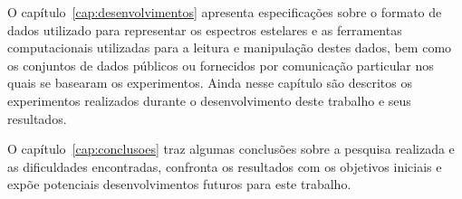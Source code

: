 O capítulo~\ref{cap:desenvolvimentos} apresenta especificações sobre o formato de dados utilizado para representar os espectros estelares e as ferramentas computacionais utilizadas para a leitura e manipulação destes dados, bem como os conjuntos de dados públicos ou fornecidos por comunicação particular nos quais se basearam os experimentos. Ainda nesse capítulo são descritos os experimentos realizados durante o desenvolvimento deste trabalho e seus resultados.

O capítulo~\ref{cap:conclusoes} traz algumas conclusões sobre a pesquisa realizada e as dificuldades encontradas, confronta os resultados com os objetivos iniciais e expõe potenciais desenvolvimentos futuros para este trabalho.


